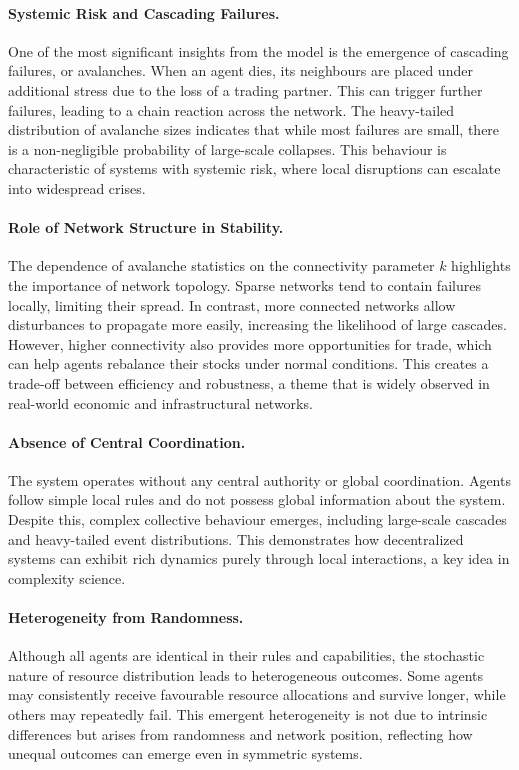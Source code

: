 \documentclass[11pt,a4paper]{article}
\begin{document}
\paragraph{Systemic Risk and Cascading Failures.}
One of the most significant insights from the model is the emergence of
cascading failures, or avalanches. When an agent dies, its neighbours are
placed under additional stress due to the loss of a trading partner. This
can trigger further failures, leading to a chain reaction across the
network. The heavy-tailed distribution of avalanche sizes indicates that
while most failures are small, there is a non-negligible probability of
large-scale collapses. This behaviour is characteristic of systems with
systemic risk, where local disruptions can escalate into widespread
crises.

\paragraph{Role of Network Structure in Stability.}
The dependence of avalanche statistics on the connectivity parameter $k$
highlights the importance of network topology. Sparse networks tend to
contain failures locally, limiting their spread. In contrast, more
connected networks allow disturbances to propagate more easily, increasing
the likelihood of large cascades. However, higher connectivity also
provides more opportunities for trade, which can help agents rebalance
their stocks under normal conditions. This creates a trade-off between
efficiency and robustness, a theme that is widely observed in real-world
economic and infrastructural networks.

\paragraph{Absence of Central Coordination.}
The system operates without any central authority or global coordination.
Agents follow simple local rules and do not possess global information
about the system. Despite this, complex collective behaviour emerges,
including large-scale cascades and heavy-tailed event distributions. This
demonstrates how decentralized systems can exhibit rich dynamics purely
through local interactions, a key idea in complexity science.

\paragraph{Heterogeneity from Randomness.}
Although all agents are identical in their rules and capabilities, the
stochastic nature of resource distribution leads to heterogeneous
outcomes. Some agents may consistently receive favourable resource
allocations and survive longer, while others may repeatedly fail. This
emergent heterogeneity is not due to intrinsic differences but arises
from randomness and network position, reflecting how unequal outcomes can
emerge even in symmetric systems.
\end{document}
